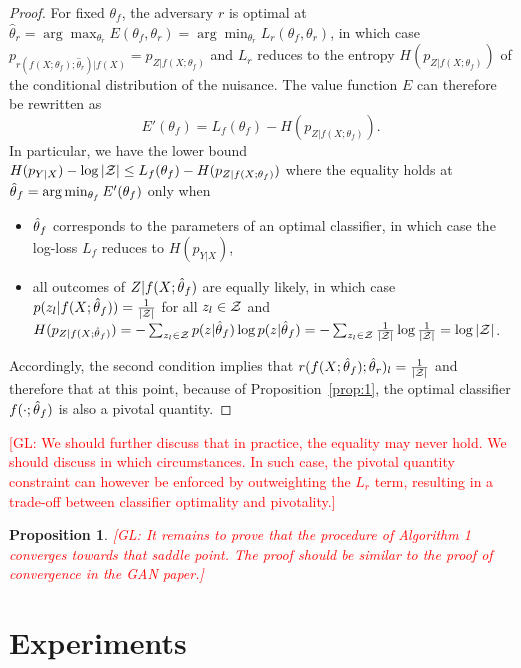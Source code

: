 \documentclass{article}
\newcommand{\glnote}[1]{\textcolor{red}{[GL: #1]}}
\theoremstyle{plain}
\newtheorem{proposition}[theorem]{Proposition}
\begin{document}
\begin{proof}

For fixed $\theta_f$, the adversary $r$ is optimal at $\hat\theta_r = \arg
\max_{\theta_r} E(\theta_f, \theta_r)  = \arg \min_{\theta_r} L_r(\theta_f,
\theta_r)$, in which case $p_{r(f(X;\theta_f);\hat\theta_r)|f(X)} = p_{Z|f(X;\theta_f)}$ and $L_r$ reduces to the entropy
$H(p_{Z|f(X;\theta_f)})$ of the conditional distribution of the nuisance. The
value function $E$ can therefore be rewritten as $$E'(\theta_f) = L_f(\theta_f) -
H(p_{Z|f(X;\theta_f)}).$$  In particular, we have the lower bound $H(p_{Y|X}) -
\log |{\cal Z}| \leq L_f(\theta_f) - H(p_{Z|f(X;\theta_f)})$ where the equality
holds at $\smash{\hat\theta}_f = \arg \min_{\theta_f} E'(\theta_f)$ only when
\begin{itemize}
    \item $\smash{\hat\theta}_f$ corresponds to
    the parameters of an optimal classifier, in which case the log-loss $L_f$
    reduces to $H(p_{Y|X})$,
    \item all
   outcomes of $Z|f(X;\smash{\hat\theta}_f)$ are equally likely, in which case
   $p(z_l|f(X;\smash{\hat\theta}_f)) = \frac{1}{|{\cal Z}|}$ for all $z_l \in {\cal
   Z}$ and $H(p_{Z|f(X;\smash{\hat\theta}_f)}) =
   -\sum_{z_l \in {\cal Z}} p(z|\smash{\hat\theta}_f) \log  p(z|\smash{\hat\theta}_f) =  -\sum_{z_l \in {\cal Z}} \frac{1}{|{\cal Z}|} \log \frac{1}{|{\cal Z}|} = \log |{\cal Z}|$.
\end{itemize}
Accordingly, the second condition implies that $r(f(X;\smash{\hat\theta}_f) ;
\smash{\hat\theta}_r )_l = \frac{1}{|{\cal Z}|}$ and therefore that at this
point, because of Proposition~\ref{prop:1}, the optimal classifier $f(\cdot;\smash{\hat\theta}_f)$ is also a pivotal quantity.
\end{proof}

\glnote{We should further discuss that in practice, the equality may never hold.
We should discuss in which circumstances. In such case, the pivotal quantity
constraint can however be enforced by outweighting the $L_r$ term, resulting in a
trade-off between classifier optimality and pivotality.}

\begin{proposition}
    \glnote{It remains to prove that the procedure of Algorithm 1
    converges towards that saddle point. The proof should be similar to the proof of convergence in the GAN paper.}
\end{proposition}

\section{Experiments}
\end{document}
